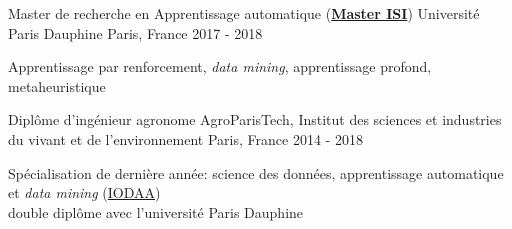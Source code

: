 

\begin{cventries}

  \cventry
    {Master de recherche en Apprentissage automatique (\href{https://mido.dauphine.fr/fr/formations-et-diplomes/masters-2/master-2-informatique/parcours-isi/presentation.html}{\textbf{Master ISI}})} %
    {Université Paris Dauphine} %
    {Paris, France} %
    {2017 - 2018} %
    {
      \begin{cvitems} %
        \item {Apprentissage par renforcement, \textit{data mining}, apprentissage profond, metaheuristique} 
      \end{cvitems}
    }
  
    \cventry
    {Diplôme d'ingénieur agronome} %
    {AgroParisTech, Institut des sciences et industries du vivant et de l'environnement} %
    {Paris, France} %
    {2014 - 2018} %
    {
      \begin{cvitems} %
        \item {Spécialisation de dernière année: science des données, apprentissage automatique et \textit{data mining} (\href{http://www2.agroparistech.fr/ufr-info/iodaa/}{IODAA})\\ double diplôme avec l'université Paris Dauphine}
      \end{cvitems}
    }


\end{cventries}
